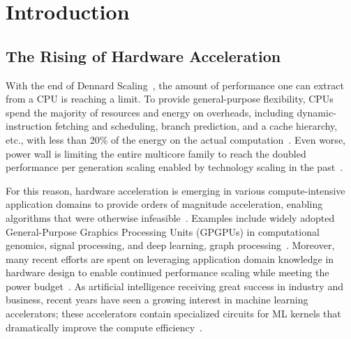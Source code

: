 \chapter{Introduction}

\section{The Rising of Hardware Acceleration}

With the end of Dennard Scaling~\cite{dennard}, the amount of performance one can extract from a CPU is reaching a limit.
To provide general-purpose flexibility, CPUs spend the majority of resources and energy on overheads, 
including dynamic-instruction fetching and scheduling, branch prediction, and a cache hierarchy, etc., 
with less than 20\% of 
the energy on the actual computation~\cite{mark}.
Even worse, power wall is limiting the entire multicore family
to reach the doubled performance per generation scaling enabled by technology scaling in the 
past~\cite{multicorescale}.

For this reason, hardware acceleration is emerging in various compute-intensive application domains 
to provide orders of magnitude acceleration, enabling algorithms that were otherwise
infeasible~\cite{genomicaccel, bioaccel, fpgadeeplearn, fpgacripto}.
Examples include widely adopted General-Purpose Graphics Processing Units (GPGPUs) 
in computational genomics, signal processing, and
deep learning, graph processing~\cite{genomicaccel, bioaccel, fpgacloudsurvey}.
Moreover, many recent efforts are spent on leveraging application domain knowledge in hardware design to enable 
continued performance scaling while meeting the power budget~\cite{turinglecture}.
As artificial intelligence receiving great success in industry and business,
recent years have seen a growing interest in machine learning accelerators;
these accelerators contain specialized circuits for ML kernels that dramatically improve the compute
efficiency~\cite{dadiannao,tpu,eie,chen2017eyeriss,tangram,truenorth}.

